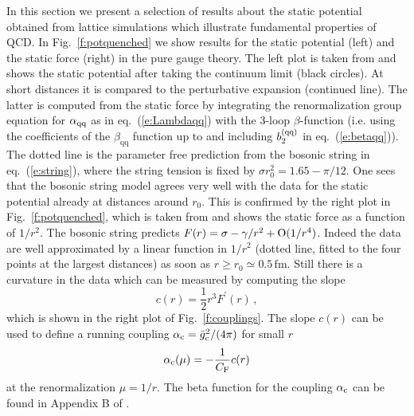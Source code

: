 \documentclass{PoS}
\newcommand{\eq}[1]{eq.~(\ref{#1})}
\newcommand{\fig}[1]{Fig.~\ref{#1}}
\def\CF{C_{\rm F}}
\def\aqq{\alpha_{\rm qq}}
\def\betaqq{\beta_\mathrm{qq}}
\def\bqq{b^{\rm(qq)}}
\def\gc{\bar{g}_\mathrm{c}}
\def\ac{\alpha_{\rm c}}
\begin{document}
In this section we present a selection of results about the static potential
obtained from lattice simulations which illustrate fundamental properties
of QCD.
In \fig{f:potquenched} we show results for the static potential (left)
and the static force (right) in the pure gauge theory.
The left plot is taken from \cite{Necco:2001xg} and shows the static potential
after taking the continuum limit (black circles). At short
distances it is compared to the perturbative expansion (continued line).
The latter is computed from the static force
by integrating the renormalization group 
equation for $\aqq$ as in \eq{e:Lambdaqq} with the 3-loop $\beta$-function
(i.e. using the coefficients of the $\betaqq$ function up to and including
$\bqq_{2}$ in \eq{e:betaqq}).
The dotted line is the parameter free prediction from the bosonic string
in \eq{e:string}, where the string tension is fixed by 
$\sigma r_0^2=1.65-\pi/12$.
One sees that the bosonic string model agrees very well with the data 
for the static potential already at distances around $r_0$.
This is confirmed by the right plot in \fig{f:potquenched}, which is
taken from \cite{Luscher:2002qv} and shows the static force as a
function of $1/r^2$. 
The bosonic string predicts $F(r)=\sigma-\gamma/r^2+{\rm O}(1/r^4)$.
Indeed the data are
well approximated by a linear function in
$1/r^2$ (dotted line, fitted to the four points at the largest distances)
as soon as $r\ge r_0\simeq0.5\,\mathrm{fm}$. Still there is a curvature in
the data which can be measured by computing the slope
\begin{equation}\label{e:slope}
c(r)=\frac{1}{2}r^3F^\prime(r)\,,
\end{equation}
which is shown in the right plot of \fig{f:couplings}. The slope $c(r)$ can be used to define a running
coupling $\ac=\gc^2/(4\pi)$ for small $r$
\begin{equation}\label{e:ac}
\ac(\mu) = -\frac{1}{\CF}c(r)
\end{equation}
at the renormalization $\mu=1/r$. The beta function for the coupling
$\ac$ can be found in Appendix B of \cite{Donnellan:2010mx}.
\end{document}
